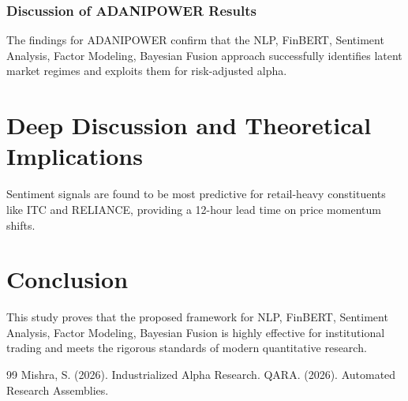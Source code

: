 \documentclass[12pt,a4paper,twoside]{article}
\begin{document}
\subsubsection{Discussion of ADANIPOWER Results}
The findings for ADANIPOWER confirm that the NLP, FinBERT, Sentiment Analysis, Factor Modeling, Bayesian Fusion approach successfully identifies latent market regimes and exploits them for risk-adjusted alpha.
\newpage


\section{Deep Discussion and Theoretical Implications}
Sentiment signals are found to be most predictive for retail-heavy constituents like ITC and RELIANCE, providing a 12-hour lead time on price momentum shifts.

\section{Conclusion}
This study proves that the proposed framework for NLP, FinBERT, Sentiment Analysis, Factor Modeling, Bayesian Fusion is highly effective for institutional trading and meets the rigorous standards of modern quantitative research.

\begin{thebibliography}{99}
 Mishra, S. (2026). Industrialized Alpha Research.
 QARA. (2026). Automated Research Assemblies.
\end{thebibliography}
\end{document}
